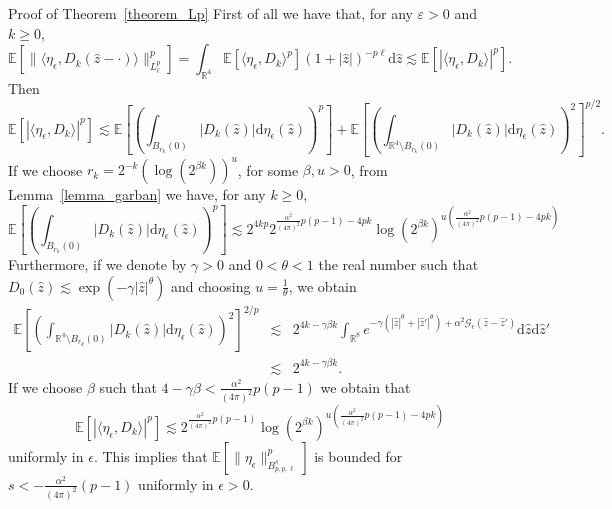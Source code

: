 \documentclass[a4paper,10pt]{article}
\newcommand{\mathd}{\mathrm{d}}
\newenvironment{proof*}[1]{\noindent\textbf{#1\ }}{\hspace*{\fill}$\Box$\medskip}
\begin{document}
\begin{proof*}{Proof of Theorem~\ref{theorem_Lp}}
  First of all we have that, for any $\varepsilon > 0$ and $k \geqslant 0$, \
  \
  \[ \mathbb{E} [\| \langle \eta_{\epsilon}, D_k (\hat{z} - \cdot) \rangle
     \|_{L^p_{\ell}}^p] = \int_{\mathbb{R}^4} \mathbb{E} [\langle
     \eta_{\epsilon}, D_k \rangle^p] (1 + | \hat{z} |)^{- p \ell} \mathd
     \hat{z} \lesssim \mathbb{E} [| \langle \eta_{\epsilon}, D_k \rangle |^p]
     . \]
  Then
  \[ \mathbb{E} [| \langle \eta_{\epsilon}, D_k \rangle |^p] \lesssim
     \mathbb{E} \left[ \left( \int_{B_{r_k} (0)} | D_k (\hat{z}) | \mathd
     \eta_{\epsilon} (\hat{z}) \right)^p \right] +\mathbb{E} \left[ \left(
     \int_{\mathbb{R}^4 \setminus B_{r_k} (0)} | D_k (\hat{z}) | \mathd
     \eta_{\epsilon} (\hat{z}) \right)^2 \right]^{p / 2} . \]
  If we choose $r_k = 2^{- k} (\log (2^{\beta k}))^u$, for some $\beta, u >
  0$, from Lemma~\ref{lemma_garban} we have, for any $k \geqslant 0$, \
  \[ \mathbb{E} \left[ \left( \int_{B_{r_k} (0)} | D_k (\hat{z}) | \mathd
     \eta_{\epsilon} (\hat{z}) \right)^p \right] \lesssim 2^{4 k p}
     2^{\frac{\alpha^2}{(4 \pi)^2} p (p - 1) - 4 p k} \log (2^{\beta k})^{u
     \left( \frac{\alpha^2}{(4 \pi)^2} p (p - 1) - 4 p k \right)} \]
  Furthermore, if we denote by $\gamma > 0$ and $0 < \theta < 1$ the real
  number such that $D_0 (\hat{z}) \lesssim \exp (- \gamma | \hat{z}
  |^{\theta})$ and choosing $u = \frac{1}{\theta}$, we obtain
  \[ \begin{array}{lll}
       \mathbb{E} \left[ \left( \int_{\mathbb{R}^4 \setminus B_{r_k} (0)} |
       D_k (\hat{z}) | \mathd \eta_{\epsilon} (\hat{z}) \right)^2 \right]^{2 /
       p} & \lesssim & 2^{4 k - \gamma \beta k} \int_{\mathbb{R}^8} e^{-
       \gamma (| \hat{z} |^{\theta} + | \hat{z}' |^{\theta}) + \alpha^2
       \mathcal{G}_{\epsilon} (\hat{z} - \hat{z}')} \mathd \hat{z} \mathd
       \hat{z}'\\
       & \lesssim & 2^{4 k - \gamma \beta k} .
     \end{array} \]
  If we choose $\beta$ such that $4 - \gamma \beta < \frac{\alpha^2}{(4
  \pi)^2} p (p - 1)$ we obtain that
  \begin{equation}
    \mathbb{E} [| \langle \eta_{\epsilon}, D_k \rangle |^p] \lesssim
    2^{\frac{\alpha^2}{(4 \pi)^2} p (p - 1)} \log (2^{\beta k})^{u \left(
    \frac{\alpha^2}{(4 \pi)^2} p (p - 1) - 4 p k \right)} \label{eq:Lp1}
  \end{equation}
  uniformly in $\epsilon$. This implies that $\mathbb{E} [\| \eta_{\epsilon}
  \|_{B^s_{p, p, \ell}}^p]$ is bounded for $s < - \frac{\alpha^2}{(4 \pi)^2}
  (p - 1)$ uniformly in $\epsilon > 0$.
  

\end{proof*}
\end{document}
